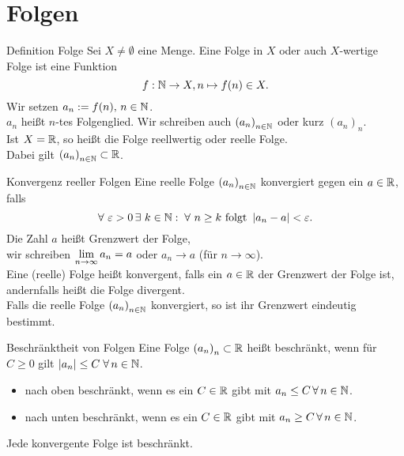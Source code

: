 \documentclass[main.tex]{subfiles}
\begin{document}
\section*{Folgen}

\begin{karte}{Definition Folge}
    Sei \( X \neq \emptyset \) eine Menge. Eine Folge in 
    \(X \) oder auch \(X \)-wertige Folge ist eine Funktion 
	\[ f : \mathbb{N} \rightarrow X, n \mapsto f(n) \in X. \]
	Wir setzen \(a_n := f(n), \, n \in \mathbb{N} \).\\
    \(a_n \) heißt \(n \)-tes Folgenglied. 
    Wir schreiben auch 
    \( {(a_n)}_{n \in \mathbb{N}} \) oder kurz \( {(a_n)}_n \).\\
    Ist \( X = \mathbb{R} \), so heißt die Folge reellwertig oder 
    reelle Folge. \\
	Dabei gilt \( {(a_n)}_{n\in\mathbb{N}} \subset \mathbb{R} \).
\end{karte}
\begin{karte}{Konvergenz reeller Folgen}
    Eine reelle Folge \( {(a_n)}_{n \in \mathbb{N}} \) konvergiert 
    gegen ein \(a \in \mathbb{R} \), falls 
    \[ \forall \, 
    \varepsilon > 0 \, \exists \, k \in \N : \; 
    \forall \, n \geq k \text{ folgt } \abs{a_n - a} 
    < \varepsilon. \]
    Die Zahl \(a\) heißt Grenzwert der Folge, \\
    wir schreiben \( \lim\limits_{n\rightarrow\infty} a_n = a \) oder 
    \( a_n\rightarrow a \) (für \( n\rightarrow\infty \)).\\
    Eine (reelle) Folge heißt konvergent, 
    falls ein \( a\in\mathbb{R} \) der Grenzwert 
    der Folge ist, andernfalls heißt die Folge divergent.\\
    
    Falls die reelle Folge \({(a_n)}_{n\in\mathbb{N}}\) konvergiert, 
    so ist ihr Grenzwert eindeutig bestimmt.
\end{karte}
\begin{karte}{Beschränktheit von Folgen}
    Eine Folge \( {(a_n)}_n \subset \mathbb{R} \) heißt 
    beschränkt, wenn für \\
    \( C\geq 0 \) gilt \( \abs{a_n} \leq C \; \forall n\in\N \).
    \begin{itemize}
        \item nach oben beschränkt, wenn es ein \(C\in\mathbb{R} \) gibt mit 
        \( a_n\leq C \, \forall n\in\N \).
        \item nach unten beschränkt, wenn es ein \(C\in\mathbb{R} \) gibt mit 
        \( a_n\geq C \, \forall n\in\N \).
    \end{itemize}
    Jede konvergente Folge ist beschränkt.
\end{karte}
\end{document}
